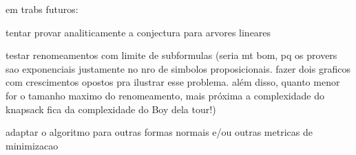 
\label{cap_conclusoes}

em trabs futuros:

tentar provar analiticamente a conjectura para arvores lineares

testar renomeamentos com limite de subformulas (seria mt bom, pq os provers sao exponenciais justamente no nro de simbolos proposicionais. fazer dois graficos com crescimentos opostos pra ilustrar esse problema. além disso, quanto menor for o tamanho maximo do renomeamento, mais próxima a complexidade do knapsack fica da complexidade do Boy dela tour!)

adaptar o algoritmo para outras formas normais e/ou outras metricas de minimizacao

